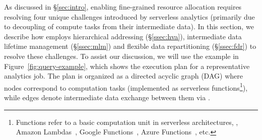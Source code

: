 As discussed in \S\ref{sec:intro}, enabling fine-grained resource allocation requires resolving four unique challenges introduced by serverless analytics (primarily due to decoupling of compute tasks from their intermediate data). In this section, we describe how \jiffy employs hierarchical addressing (\S\ref{ssec:hva}), intermediate data lifetime management (\S\ref{ssec:mlm}) and flexible data repartitioning (\S\ref{ssec:fdr}) to resolve these challenges. To assist our discussion, we will use the example in Figure~\ref{fig:query-example}, which shows the execution plan for a representative analytics job. The plan is organized as a directed acyclic graph (DAG) where nodes correspond to computation tasks (implemented as serverless functions\footnote{Functions refer to a basic computation unit in serverless architectures, \eg, Amazon Lambdas~\cite{alambda}, Google Functions~\cite{googlefunctions}, Azure Functions~\cite{azureFunctions}, etc.}), while edges denote intermediate data exchange between them via \jiffy. 

